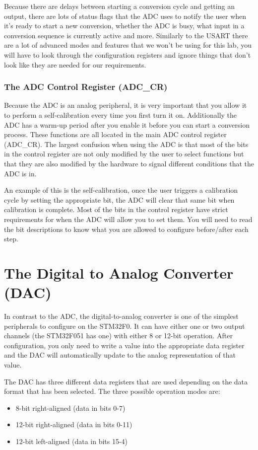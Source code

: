 \documentclass[11pt,fleqn]{book} %
\begin{document}
Because there are delays between starting a conversion cycle and getting an output, there are lots of status flags that the ADC uses to notify the user when it's ready to start a new conversion, whether the ADC is busy, what input in a conversion sequence is currently active and more. Similarly to the USART there are a lot of advanced modes and features that we won't be using for this lab, you will have to look through the configuration registers and ignore things that don't look like they are needed for our requirements. 

\subsubsection{The ADC Control Register (ADC\_CR)}
Because the ADC is an analog peripheral, it is very important that you allow it to perform a self-calibration every time you first turn it on. Additionally the ADC has a warm-up period after you enable it before you can start a conversion process. These functions are all located in the main ADC control register (ADC\_CR). The largest confusion when using the ADC is that most of the bits in the control register are not only modified by the user to select functions but that they are also modified by the hardware to signal different conditions that the ADC is in. 

An example of this is the self-calibration, once the user triggers a calibration cycle by setting the appropriate bit, the ADC will clear that same bit when calibration is complete. Most of the bits in the control register have strict requirements for when the ADC will allow you to set them. You will need to read the bit descriptions to know what you are allowed to configure before/after each step.

\section{The Digital to Analog Converter (DAC)}
In contrast to the ADC, the digital-to-analog converter is one of the simplest peripherals to configure on the STM32F0. It can have either one or two output channels (the STM32F051 has one) with either 8 or 12-bit operation. After configuration, you only need to write a value into the appropriate data register and the DAC will automatically update to the analog representation of that value.

The DAC has three different data registers that are used depending on the data format that has been selected. The three possible operation modes are:
\begin{itemize}
    \item 8-bit right-aligned (data in bits 0-7)
    \item 12-bit right-aligned (data in bits 0-11)
    \item 12-bit left-aligned (data in bits 15-4)
\end{itemize}
\end{document}
